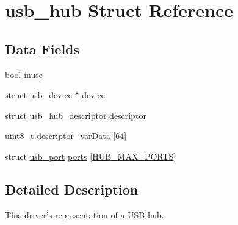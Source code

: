 \hypertarget{structusb__hub}{\section{usb\-\_\-hub Struct Reference}
\label{structusb__hub}
}
\subsection*{Data Fields}
\begin{DoxyCompactItemize}
\item 
bool \hyperlink{structusb__hub_ace7d53e067ed6a06c16e1949b0d322dc}{inuse}
\item 
struct usb\-\_\-device $\ast$ \hyperlink{structusb__hub_a45058f0f3009116d905d6705f15d3654}{device}
\item 
struct usb\-\_\-hub\-\_\-descriptor \hyperlink{structusb__hub_a26e8912e4d2f0b850e01d729d9057277}{descriptor}
\item 
uint8\-\_\-t \hyperlink{structusb__hub_a91257987cdc0c02ea8814d9d84889d4a}{descriptor\-\_\-var\-Data} \mbox{[}64\mbox{]}
\item 
struct \hyperlink{structusb__port}{usb\-\_\-port} \hyperlink{structusb__hub_a4a1238ce43bf4705ca6de079ad0ec86c}{ports} \mbox{[}\hyperlink{usbhub_8c_a51cf60587d106697dbd690ac14729716}{H\-U\-B\-\_\-\-M\-A\-X\-\_\-\-P\-O\-R\-T\-S}\mbox{]}
\end{DoxyCompactItemize}


\subsection{Detailed Description}
This driver's representation of a U\-S\-B hub. 

